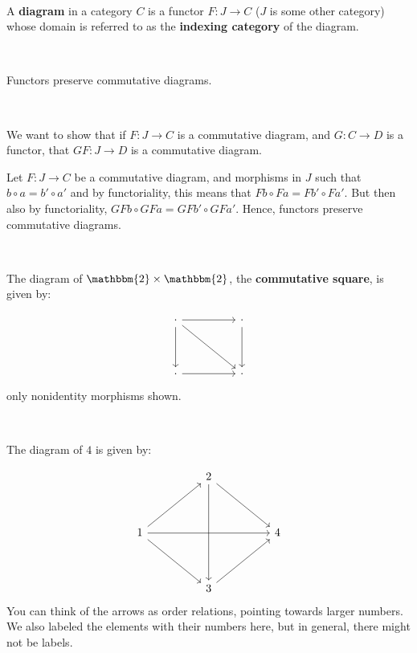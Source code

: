 \documentclass{article}
\begin{document}
\begin{definition}[Diagram]
\

A \textbf{diagram} in a category $C$ is a functor $F: J \to C$ ($J$ is some other category) whose domain is referred to as the \textbf{indexing category} of the diagram.  
\end{definition}

\begin{lemma}
\

Functors preserve commutative diagrams.
\end{lemma}

\begin{customproof}
\

We want to show that if $F: J \to C$ is a commutative diagram, and $G: C \to D$ is a functor, that $GF: J \to D$ is a commutative diagram.

Let $F: J \to C$ be a commutative diagram, and morphisms in $J$ such that $b \circ a = b' \circ a'$ and by functoriality, this means that $Fb \circ Fa = Fb' \circ Fa'$. But then also by functoriality, $GFb \circ GFa = GFb' \circ GFa'$. Hence, functors preserve commutative diagrams.
\end{customproof}

\begin{example}
\

The diagram of $\mathbbm{2} \times \mathbbm{2}$, the \textbf{commutative square}, is given by:

\[\begin{tikzcd}
	\cdot &&  \cdot\\
    \\
    \cdot && \cdot
    \arrow[ from=1-1, to=1-3 ]
    \arrow[ from=1-3, to=3-3]
    \arrow[from=1-1, to=3-3]
    \arrow[from=1-1, to=3-1]
    \arrow[from=3-1, to=3-3]
\end{tikzcd}\]only nonidentity morphisms shown.
\end{example}

\begin{example}
\

The diagram of $4$ is given by: 

\[\begin{tikzcd}
	 &&   2 &&\\
    \\
    1 && && 4\\
    \\
    && 3 &&
    \arrow[from=3-1, to=1-3]
    \arrow[from=1-3, to=5-3]
    \arrow[from=3-1, to=5-3]
    \arrow[from=5-3, to=3-5]
    \arrow[from=3-1, to=3-5]
    \arrow[from=1-3, to=3-5]
\end{tikzcd}\]
You can think of the arrows as order relations, pointing towards larger numbers. We also labeled the elements with their numbers here, but in general, there might not be labels. 
\end{example}
\end{document}
